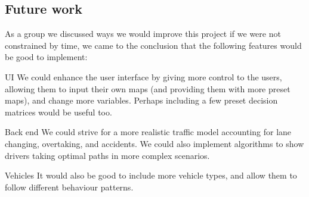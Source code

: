	\subsection{Future work}
		As a group we discussed ways we would improve this project if we were not constrained by time, we came to the conclusion that the following features would be good to implement:
        \begin{description}
        \item{UI} We could enhance the user interface by giving more control to the users, allowing them to input their own maps (and providing them with more preset maps), and change more variables. Perhaps including a few preset decision matrices would be useful too.
        \item{Back end} We could strive for a more realistic traffic model accounting for lane changing, overtaking, and accidents. We could also implement algorithms to show drivers taking optimal paths in more complex scenarios.
       	\item{Vehicles} It would also be good to include more vehicle types, and allow them to follow different behaviour patterns.
        \end{description}
        